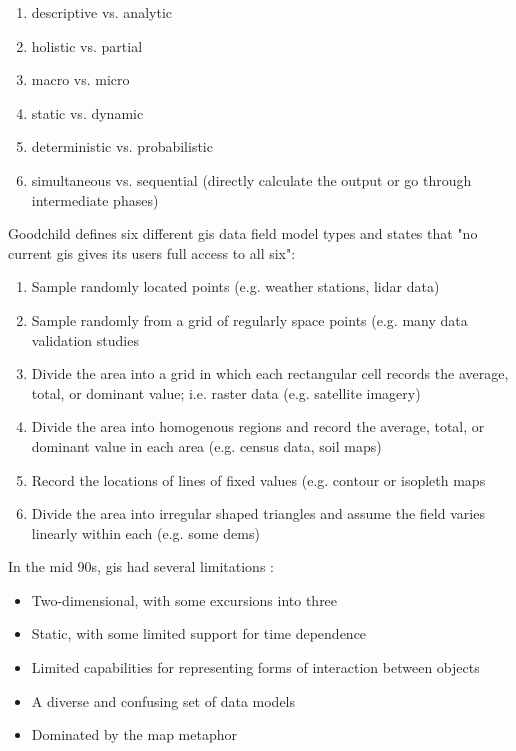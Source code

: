 \begin{enumerate}[itemsep=0pt,parsep=0pt]
	\item{descriptive vs. analytic}
	\item{holistic vs. partial}
	\item{macro vs. micro}
	\item{static vs. dynamic}
	\item{deterministic vs. probabilistic}
	\item{simultaneous vs. sequential (directly calculate the output or go through intermediate phases)}
\end{enumerate}

Goodchild defines six different \ac{gis} data field model types and states that "no current \ac{gis} gives its users full access to all six":

\begin{enumerate}
    \setlength{\itemsep}{0pt}%
    \setlength{\parskip}{0pt}%
	\item{Sample randomly located points (e.g. weather stations, \ac{lidar} data)}
	\item{Sample randomly from a grid of regularly space points (e.g. many data validation studies}
	\item{Divide the area into a grid in which each rectangular cell records the average, total, or dominant value; i.e. raster data (e.g. satellite imagery)}
	\item{Divide the area into homogenous regions and record the average, total, or dominant value in each area (e.g. census data, soil maps)}
	\item{Record the locations of lines of fixed values (e.g. contour or isopleth maps}
	\item{Divide the area into irregular shaped triangles and assume the field varies linearly within each (e.g. some \acp{dem})}
\end{enumerate}

In the mid 90s, \ac{gis} had several limitations \cite{goodchildGeographicInformationSystems1994}:

\begin{itemize}
    \setlength{\itemsep}{0pt}%
    \setlength{\parskip}{0pt}%
	\item{Two-dimensional, with some excursions into three}
	\item{Static, with some limited support for time dependence}
	\item{Limited capabilities for representing forms of interaction between objects}
	\item{A diverse and confusing set of data models}
	\item{Dominated by the map metaphor}
\end{itemize}

